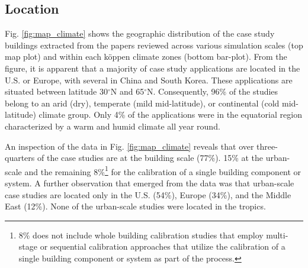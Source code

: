\documentclass[review]{elsarticle}
\begin{document}
\begin{table}[h!]
\caption{Simulation engines used in the reviewed calibration applications ($N=107$).} 
\label{tab:sim_engine}
\centering
{}
\end{table}

\subsection{Location}

Fig. \ref{fig:map_climate} shows the geographic distribution of the case study buildings extracted from the papers reviewed across various simulation scales (top map plot) and within each k\"{o}ppen climate zones (bottom bar-plot). From the figure, it is apparent that a majority of case study applications are located in the U.S. or Europe, with several in China and South Korea. These applications are situated between latitude 30$^{\circ}$N and 65$^{\circ}$N. Consequently, 96\% of the studies belong to an arid (dry), temperate (mild mid-latitude), or continental (cold mid-latitude) climate group. Only 4\% of the applications were in the equatorial region characterized by a warm and humid climate all year round. 

An inspection of the data in Fig. \ref{fig:map_climate} reveals that over three-quarters of the case studies are at the building scale (77\%). 15\% at the urban-scale and the remaining 8\%\footnote{8\% does not include whole building calibration studies that employ multi-stage or sequential calibration approaches that utilize the calibration of a single building component or system as part of the process.} for the calibration of a single building component or system. A further observation that emerged from the data was that urban-scale case studies are located only in the U.S. (54\%), Europe (34\%), and the Middle East (12\%). None of the urban-scale studies were located in the tropics.
\end{document}
